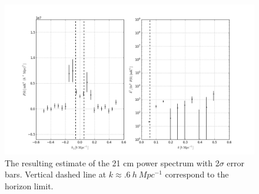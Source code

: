 \documentclass[twocolumn,numberedappendix]{emulateapj} \shorttitle{PSA64}
\begin{document}
%
%
%
%
%
%
%
%
%
%


\begin{figure}[h!]\centering
\includegraphics[width=1.5\columnwidth,height=1\columnwidth]{plots/pk_k3pk.png}
\caption{The resulting estimate of the 21 cm power spectrum with 2$\sigma$ error
bars. Vertical dashed line at $k\approx{.6\ h\ Mpc^{-1}}$ correspond to the
horizon limit.}
\label{fig:final_pspec}
\end{figure}
\end{document}
